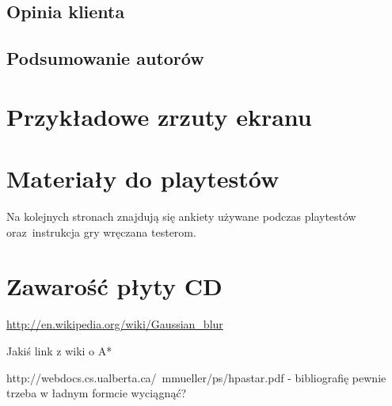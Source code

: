\documentclass[licencjacka]{pracamgr}
\begin{document}
  \section{Opinia klienta}

  \section{Podsumowanie autorów}

\appendix

  \chapter{Przykładowe zrzuty ekranu}

  \chapter{Materiały do playtestów}
  Na kolejnych stronach znajdują się ankiety używane podczas playtestów
  oraz~instrukcja gry wręczana testerom.

    
    
    

  \chapter{Zawarość płyty CD}


\begin{thebibliography}{99}
  \item{\url{http://en.wikipedia.org/wiki/Gaussian_blur}}
  \item{Jakiś link z wiki o A*}
  \item{http://webdocs.cs.ualberta.ca/~mmueller/ps/hpastar.pdf - bibliografię pewnie trzeba w ładnym formcie wyciągnąć?}

\end{thebibliography}
\end{document}
